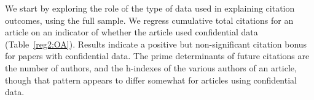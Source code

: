 \documentclass{cje} %
\theoremstyle{plain}%
\theoremstyle{definition}
\theoremstyle{remark}
\begin{document}

We start by exploring the role of the type of data used in explaining citation outcomes, using the full sample. We regress cumulative total citations for an article on an indicator of whether the article used confidential data (Table~\ref{reg2:OA}). Results indicate a positive but non-significant citation bonus for papers with confidential data. The prime determinants of future citations are the number of authors, and the h-indexes of the various authors of an article, though that pattern appears to differ somewhat for articles using confidential data. 
\end{document}
